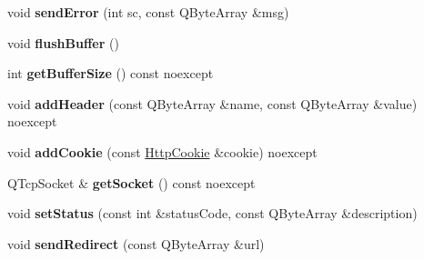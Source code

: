 \begin{DoxyCompactItemize}
\mbox{\label{class_response_a478441dad471d91725c2d3664b073bd0}} 
void {\bfseries send\+Error} (int sc, const Q\+Byte\+Array \&msg)
\item 
\mbox{\label{class_response_a9f70f5c6621b165bcaf1c530ec1db52e}} 
void {\bfseries flush\+Buffer} ()
\item 
\mbox{\label{class_response_a5e68aaad0a2867d7e00168bb158efea4}} 
int {\bfseries get\+Buffer\+Size} () const noexcept
\item 
\mbox{\label{class_response_adae7bde8f1f52edd915e709053b538d5}} 
void {\bfseries add\+Header} (const Q\+Byte\+Array \&name, const Q\+Byte\+Array \&value) noexcept
\item 
\mbox{\label{class_response_aa4f8781c5106b744129b8742965ea18e}} 
void {\bfseries add\+Cookie} (const \hyperlink{class_http_cookie}{Http\+Cookie} \&cookie) noexcept
\item 
\mbox{\label{class_response_a29febc0eaefab2f6d81fb41057d81060}} 
Q\+Tcp\+Socket \& {\bfseries get\+Socket} () const noexcept
\item 
\mbox{\label{class_response_a6168bc9d8c92941a3780fd56c44c6f82}} 
void {\bfseries set\+Status} (const int \&status\+Code, const Q\+Byte\+Array \&description)
\item 
\mbox{\label{class_response_a7acf6886b6b06704b8bbbb0692948a73}} 
void {\bfseries send\+Redirect} (const Q\+Byte\+Array \&url)
\end{DoxyCompactItemize}
